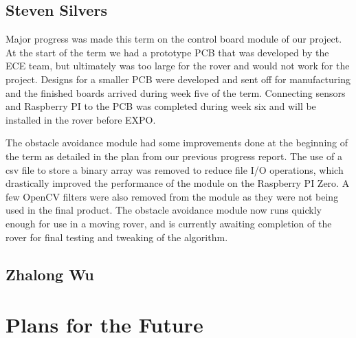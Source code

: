 \documentclass[10pt,letterpaper,onecolumn,draftclsnofoot,journal]{IEEEtran}
\begin{document}
\subsection{\textbf{Steven Silvers}}
Major progress was made this term on the control board module of our project. At the start of the term we had a prototype PCB that was developed by the ECE team, but ultimately was too large for the rover and would not work for the project. Designs for a smaller PCB were developed and sent off for manufacturing and the finished boards arrived during week five of the term. Connecting sensors and Raspberry PI to the PCB was completed during week six and will be installed in the rover before EXPO.\vspace{.3cm}
\par 
The obstacle avoidance module had some improvements done at the beginning of the term as detailed in the plan from our previous progress report. The use of a csv file to store a binary array was removed to reduce file I/O operations, which drastically improved the performance of the module on the Raspberry PI Zero. A few OpenCV filters were also removed from the module as they were not being used in the final product. The obstacle avoidance module now runs quickly enough for use in a moving rover, and is currently awaiting completion of the rover for final testing and tweaking of the algorithm.

\subsection{\textbf{Zhalong Wu}}


\section{\textbf{Plans for the Future}}
\end{document}

